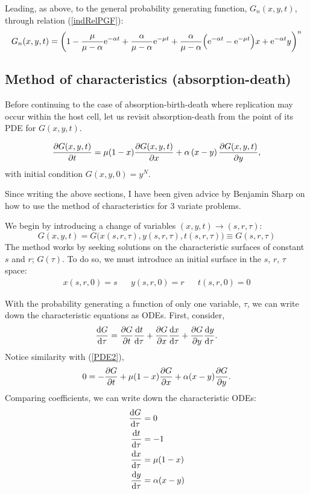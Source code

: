    


\noindent
Leading, as above, to the general probability generating function, $G_n(x,y,t)$, through relation (\ref{indRelPGF}):
\begin{equation*}
G_n(x,y,t) = \left(1-\frac{\mu}{\mu - \alpha}  {\rm e}^{-\alpha t}  + \frac{\alpha}{\mu - \alpha} {\rm e}^{-\mu t}  + \frac{\alpha}{\mu - \alpha} \Big(   {\rm e}^{-\alpha t} - {\rm e}^{-\mu t} \Big)x +  {\rm e}^{-\alpha t} y\right)^n
\end{equation*}




\subsection{Method of characteristics (absorption-death)}

Before continuing to the case of absorption-birth-death where replication may occur within the host cell, let us revisit absorption-death from the point of its PDE for $G(x,y,t)$.  

\begin{equation}
\label{PDE2}
\displaystyle\frac{\partial G(x,y,t)}{\partial t} = \mu(1-x) \displaystyle\frac{\partial G(x,y,t)}{\partial x}+\alpha\left(x - y\right) \displaystyle\frac{\partial G(x,y,t)}{\partial y},
\end{equation}
with initial condition $G(x,y,0) = y^N$.

Since writing the above sections, I have been given advice by Benjamin Sharp on how to use the method of characteristics for 3 variate problems.\par
We begin by introducing a change of variables $(x,y,t) \to (s,r,\tau)$:
$$G(x,y,t) = G\big(x(s,r,\tau), y(s,r,\tau), t(s,r,\tau) \big) \equiv G(s,r,\tau)$$
The method works by seeking solutions on the characteristic surfaces of constant $s$ and $r$; $G(\tau)$. To do so, we must introduce an initial surface in the $s$, $r$, $\tau$ space:
\begin{align}
\label{ICpar}
x(s,r,0) = s && y(s,r,0) = r && t(s,r,0) = 0
\end{align}

With the probability generating a function of only one variable, $\tau$, we can write down the characteristic equations as ODEs. First, consider,
\begin{equation*}
\displaystyle\frac{{\rm d} G}{{\rm d} \tau} = \displaystyle\frac{\partial G}{\partial t} \displaystyle\frac{{\rm d} t}{{\rm d} \tau}  +  \displaystyle\frac{\partial G}{\partial x}\displaystyle\frac{{\rm d} x}{{\rm d} \tau} + \displaystyle\frac{\partial G}{\partial y}\displaystyle\frac{{\rm d} y}{{\rm d} \tau} .
\end{equation*}
Notice similarity with (\ref{PDE2}),
$$0  = -\displaystyle\frac{\partial G}{\partial t} + \mu(1-x)\displaystyle\frac{\partial G}{\partial x} + \alpha (x-y)\displaystyle\frac{\partial G}{\partial y}.$$
Comparing coefficients, we can write down the characteristic ODEs: 
\begin{align}
\displaystyle\frac{{\rm d} G}{{\rm d} \tau} &= 0\label{ch11}\\
\displaystyle\frac{{\rm d} t}{{\rm d} \tau} &= -1\label{ch12}\\
\displaystyle\frac{{\rm d} x}{{\rm d} \tau} &= \mu(1-x)\label{ch13}\\
\displaystyle\frac{{\rm d} y}{{\rm d} \tau} &= \alpha(x-y)\label{ch14}
\end{align}


